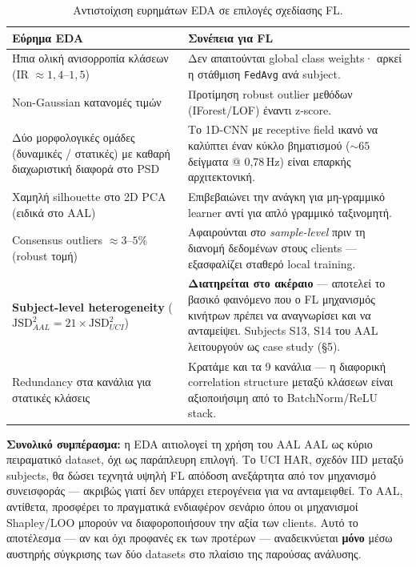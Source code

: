 \begin{table}[H]
    \centering
    \caption{Αντιστοίχιση ευρημάτων EDA σε επιλογές σχεδίασης FL.}
    \label{tab:eda_to_fl}
    \small
    \begin{tabular}{p{4.5cm} p{8.3cm}}
        \toprule
        \textbf{Εύρημα EDA} & \textbf{Συνέπεια για FL} \\
        \midrule
        Ήπια ολική ανισορροπία κλάσεων (IR $\approx 1{,}4$–$1{,}5$)
          & Δεν απαιτούνται global class weights· αρκεί η στάθμιση
            \texttt{FedAvg} ανά subject. \\
        Non-Gaussian κατανομές τιμών
          & Προτίμηση robust outlier μεθόδων (IForest/LOF) έναντι
            z-score. \\
        Δύο μορφολογικές ομάδες (δυναμικές / στατικές) με καθαρή
        διαχωριστική διαφορά στο PSD
          & Το 1D-CNN με receptive field ικανό να καλύπτει έναν κύκλο
            βηματισμού ($\sim 65$ δείγματα @ 0{,}78\,Hz) είναι επαρκής
            αρχιτεκτονική. \\
        Χαμηλή silhouette στο 2D PCA (ειδικά στο AAL)
          & Επιβεβαιώνει την ανάγκη για μη-γραμμικό learner αντί
            για απλό γραμμικό ταξινομητή. \\
        Consensus outliers $\approx 3$–$5\%$ (robust τομή)
          & Αφαιρούνται \textit{στο sample-level} πριν τη διανομή
            δεδομένων στους clients — εξασφαλίζει σταθερό local
            training. \\
        \textbf{Subject-level heterogeneity} ($\text{JSD}^2_{AAL}
        = 21\times \text{JSD}^2_{UCI}$)
          & \textbf{Διατηρείται στο ακέραιο} — αποτελεί το βασικό
            φαινόμενο που ο FL μηχανισμός κινήτρων πρέπει να
            αναγνωρίσει και να ανταμείψει. Subjects S13, S14 του AAL
            λειτουργούν ως case study (§5). \\
        Redundancy στα κανάλια για στατικές κλάσεις
          & Κρατάμε και τα 9 κανάλια — η διαφορική correlation
            structure μεταξύ κλάσεων είναι αξιοποιήσιμη από το
            BatchNorm/ReLU stack. \\
        \bottomrule
    \end{tabular}
\end{table}

\textbf{Συνολικό συμπέρασμα:} η EDA αιτιολογεί τη χρήση του AAL
AAL ως κύριο πειραματικό dataset, όχι ως παράπλευρη επιλογή.
Το UCI HAR, σχεδόν IID μεταξύ subjects, θα δώσει τεχνητά υψηλή
FL απόδοση ανεξάρτητα από τον μηχανισμό συνεισφοράς — ακριβώς
γιατί δεν υπάρχει ετερογένεια για να ανταμειφθεί. Το AAL,
αντίθετα, προσφέρει το πραγματικά ενδιαφέρον σενάριο όπου οι
μηχανισμοί Shapley/LOO μπορούν να διαφοροποιήσουν την αξία των
clients. Αυτό το αποτέλεσμα — αν και όχι προφανές εκ των
προτέρων — αναδεικνύεται \textbf{μόνο} μέσω αυστηρής
σύγκρισης των δύο datasets στο πλαίσιο της παρούσας ανάλυσης.
